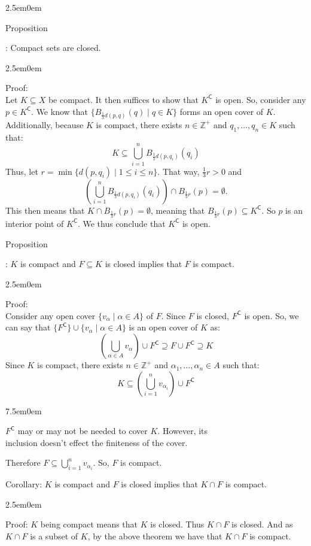\documentclass{book}
\newcommand{\hThree}{%
   \color{PineGreen}
   \fontsize{13}{15}\selectfont%
}
\newcommand{\teachComment}{
   \color{Orange}%
   \fontsize{12}{14}\selectfont%
}
\newenvironment{myIndent}{%
   \begin{adjustwidth}{2.5em}{0em}%
}{%
   \end{adjustwidth}%
}
\newenvironment{myTindent}{%
   \begin{adjustwidth}{7.5em}{0em}%
}{%
   \end{adjustwidth}%
}
\newcommand{\retTwo}{\hfill\bigbreak}
\newcommand{\comp}{\mathsf{C}}
\newcounter{PropNumber}
\newcommand{\propCount}[1][1]{%
   \addtocounter{PropNumber}{#1}%
   \thePropNumber%
}
\begin{document}
{\begin{myIndent}
      Proposition \propCount: Compact sets are closed.

      {\begin{myIndent} \hThree
         Proof:\\
         Let $K \subseteq X$ be compact. It then suffices to show that $K^\comp$ is open. So, consider any $p \in K^\comp$. We know that $\{B_{\frac{1}{3}d(p, q)}(q) \mid q \in K\}$ forms an open cover of $K$. Additionally, because $K$ is compact, there exists $n \in \mathbb{Z}^+$ and $q_1, \ldots, q_n \in K$ such that:
         \[K \subseteq \bigcup_{i=1}^n{B_{\frac{1}{3}d(p, q_i)}(q_i)}\]
         Thus, let $r = \min{\{d(p, q_i) \mid 1 \leq i \leq n\}}$. That way, $\frac{1}{3}r > 0$ and \[\left(\bigcup_{i=1}^n{B_{\frac{1}{3}d(p, q_i)}(q_i)} \right) \cap B_{\frac{1}{3}r}(p) = \emptyset\text{.}\]
         This then means that $K \cap B_{\frac{1}{3}r}(p) = \emptyset$, meaning that $B_{\frac{1}{3}r}(p) \subseteq K^\comp$. So $p$ is an interior point of $K^\comp$. We thus conclude that $K^\comp$ is open. \retTwo
      \end{myIndent}}
      
      Proposition \propCount: $K$ is compact and $F \subseteq K$ is closed implies that $F$ is compact.
      
      {\begin{myIndent} \hThree
         Proof:\\
         Consider any open cover $\{v_\alpha \mid \alpha \in A\}$ of $F$. Since $F$ is closed, $F^\comp$ is open. So, we can say that $\{F^\comp\} \cup \{v_\alpha \mid \alpha \in A\}$ is an open cover of $K$ as: \[\left(\bigcup_{\alpha \in A}{v_\alpha}\right) \cup F^\comp \supseteq F \cup F^\comp \supseteq K\] 
         \newpage
         Since $K$ is compact, there exists $n \in \mathbb{Z}^+$ and $\alpha_1, \ldots, \alpha_n \in A$ such that: \[K \subseteq \left(\bigcup_{i=1}^n{v_{\alpha_i}}\right) \cup F^\comp\]
         {\begin{myTindent} \teachComment
            $F^\comp$ may or may not be needed to cover $K$. However, its \\inclusion doesn't effect the finiteness of the cover. \retTwo
         \end{myTindent}}
         Therefore $F \subseteq {\displaystyle \bigcup_{i=1}^n{v_{\alpha_i}}}$. So, $F$ is compact. \retTwo
      \end{myIndent}}

      Corollary: $K$ is compact and $F$ is closed implies that $K \cap F$ is compact.
      {\begin{myIndent} \hThree
         Proof: $K$ being compact means that $K$ is closed. Thus $K \cap F$ is closed. And as $K \cap F$ is a subset of $K$, by the above theorem we have that $K \cap F$ is compact.
         \retTwo
      \end{myIndent}}


\end{myIndent}}
\end{document}
